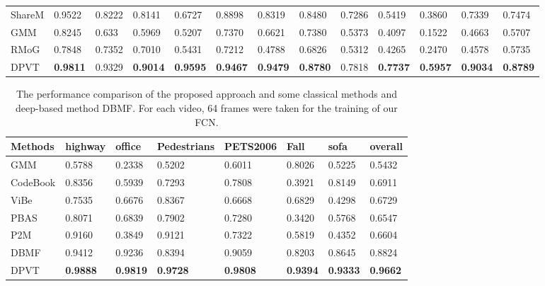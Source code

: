 \documentclass[journal]{IEEEtran}
\begin{document}
\begin{table}[!t]
\begin{tabular}{lllllllllllll}
ShareM\cite{2015_ICME_ShareModel}      & 0.9522   & 0.8222  & 0.8141     & 0.6727    & 0.8898 & 0.8319  & 0.8480   & 0.7286     & 0.5419     & 0.3860 & 0.7339  & 0.7474  \\
GMM\cite{Zivkovic2004}         & 0.8245   & 0.633   & 0.5969     & 0.5207    & 0.7370 & 0.6621  & 0.7380   & 0.5373     & 0.4097     & 0.1522 & 0.4663  & 0.5707  \\
RMoG\cite{Varadarajan2013}        & 0.7848   & 0.7352  & 0.7010     & 0.5431    & 0.7212 & 0.4788  & 0.6826   & 0.5312     & 0.4265     & 0.2470 & 0.4578  & 0.5735  \\ \hline
DPVT        & \textbf{0.9811}   & 0.9329  & \textbf{0.9014}     & \textbf{0.9595}    & \textbf{0.9467} & \textbf{0.9479}  & \textbf{0.8780}   & 0.7818     & \textbf{0.7737}     & \textbf{0.5957} & \textbf{0.9034}  & \textbf{0.8789} \\ \hline
\end{tabular}
\end{table}

\begin{table}[!t]
\centering
\caption{The performance comparison of the proposed approach and some classical methods and deep-based method DBMF. For each video, 64 frames were taken for the training of our FCN.}
\label{tab2}
\begin{tabular}{llllllll}
\hline
Methods  & highway & office & Pedestrians & PETS2006 & Fall   & sofa   & overall \\ \hline
GMM\cite{Stauffer1999}      & 0.5788  & 0.2338 & 0.5202      & 0.6011   & 0.8026 & 0.5225 & 0.5432  \\
CodeBook\cite{WU2010739} & 0.8356  & 0.5939 & 0.7293      & 0.7808   & 0.3921 & 0.8149 & 0.6911  \\
ViBe\cite{Barnich2011_2011_TIP}     & 0.7535  & 0.6676 & 0.8367      & 0.6668   & 0.6829 & 0.4298 & 0.6729  \\
PBAS\cite{Hofmann2012Background}     & 0.8071  & 0.6839 & 0.7902      & 0.7280   & 0.3420 & 0.5768 & 0.6547  \\
P2M\cite{Yang2016P2M}      & 0.9160  & 0.3849 & 0.9121      & 0.7322   & 0.5819 & 0.4352 & 0.6604  \\
DBMF\cite{Yang2018DBMF}     & 0.9412  & 0.9236 & 0.8394      & 0.9059   & 0.8203 & 0.8645 & 0.8824  \\ \hline
DPVT     & \textbf{0.9888}  & \textbf{0.9819} & \textbf{0.9728}      & \textbf{0.9808}   & \textbf{0.9394} & \textbf{0.9333} & \textbf{0.9662}  \\ \hline
\end{tabular}
\end{table}
\end{document}
